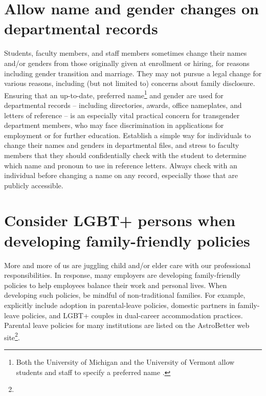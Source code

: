 \section {Allow name and gender changes on departmental records}
\label{name-changes}
Students, faculty members, and staff members sometimes change their names and/or genders from those originally given at enrollment or hiring, for reasons including gender transition and marriage. They may not pursue a legal change for various reasons, including (but not limited to) concerns about family disclosure. Ensuring that an up-to-date, preferred name\footnote{Both the University of Michigan  and the University of Vermont allow students and staff to specify a preferred name\newline{} .} 
and gender are used for departmental records -- including directories, awards, office nameplates, and letters of reference -- is an especially vital practical concern for transgender department members, who may face discrimination in applications for employment or for further education. Establish a simple way for individuals to change their names and genders in departmental files, and stress to faculty members that they should confidentially check with the student to determine which name and pronoun to use in reference letters. Always check with an individual before changing a name on any record, especially those that are publicly accessible.


\section {Consider LGBT+ persons when developing family-friendly policies}
\label{families}
More and more of us are juggling child and/or elder care with our professional responsibilities.  In response, many employers are developing family-friendly policies to help employees balance their work and personal lives.  When developing such policies, be mindful of non-traditional families.  For example, explicitly include adoption in parental-leave policies, domestic partners in family-leave policies, and LGBT+ couples in dual-career accommodation practices. Parental leave policies for many institutions are listed on the AstroBetter web site\footnote{ }.


